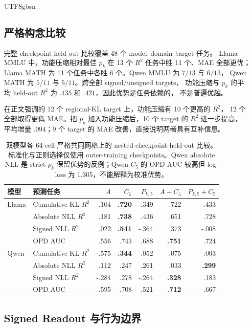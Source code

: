 \documentclass[letterpaper]{article} %
\begin{document}
\begin{CJK*}{UTF8}{gbsn}
\subsection{严格构念比较}

完整 checkpoint-held-out 比较覆盖 48 个 model--domain--target 任务。
Llama MMLU 中，功能压缩相对最佳 $p_k$ 在 13 个 $R^2$ 任务中胜 11 个、MAE 全部更优；
Llama MATH 为 11 个任务中各胜 6 个。Qwen MMLU 为 $7/13$ 与 $6/13$，
Qwen MATH 为 $5/11$ 与 $5/11$。跨全部 signed/unsigned targets，
功能压缩与 $p_k$ 的平均 held-out $R^2$ 为 $.435$ 和 $.421$，因此优势是任务依赖的，
不是普遍优越。

在正文强调的 12 个 regional-KL target 上，功能压缩有 10 个更高的 $R^2$，
12 个全部取得更低 MAE。把 $p_k$ 加入功能压缩后，10 个 target 的 $R^2$ 进一步提高，
平均增量 $.094$；9 个 target 的 MAE 改善，直接说明两者具有互补信息。

\begin{table}[t]
\centering
\small
\setlength{\tabcolsep}{3.5pt}
\begin{tabular}{llrrrrr}
\toprule
模型 & 预测任务 & $A$ & $C_5$ & $P_{k,5}$ & $A+C_5$ & $P_{k,5}+C_5$ \\
\midrule
Llama & Cumulative KL $R^2$ & .104 & \textbf{.720} & -.349 & .722 & .433 \\
 & Absolute NLL $R^2$ & .181 & \textbf{.738} & .436 & .651 & .728 \\
 & Signed NLL $R^2$ & .022 & \textbf{.541} & -.364 & .373 & -.008 \\
 & OPD AUC & .556 & .743 & .688 & \textbf{.751} & .724 \\
Qwen & Cumulative KL $R^2$ & -.575 & \textbf{.344} & .052 & .075 & -.003 \\
 & Absolute NLL $R^2$ & .112 & .247 & .261 & .033 & \textbf{.299} \\
 & Signed NLL $R^2$ & -.284 & .278 & -.264 & \textbf{.328} & .183 \\
 & OPD AUC & .595 & .708 & .521 & \textbf{.712} & .667 \\
\bottomrule
\end{tabular}
\caption{双模型各 64-cell 严格共同网格上的 nested checkpoint-held-out 比较。
标准化与正则选择仅使用 outer-training checkpoints。Qwen absolute NLL 是 strict $p_k$
保留优势的反例；Qwen $C_5$ 的 OPD AUC 较高但 log-loss 为 1.305，不能解释为校准优势。}
\label{tab:supp-rr5}
\end{table}

\subsection{Signed Readout 与行为边界}


\end{CJK*}
\end{document}

